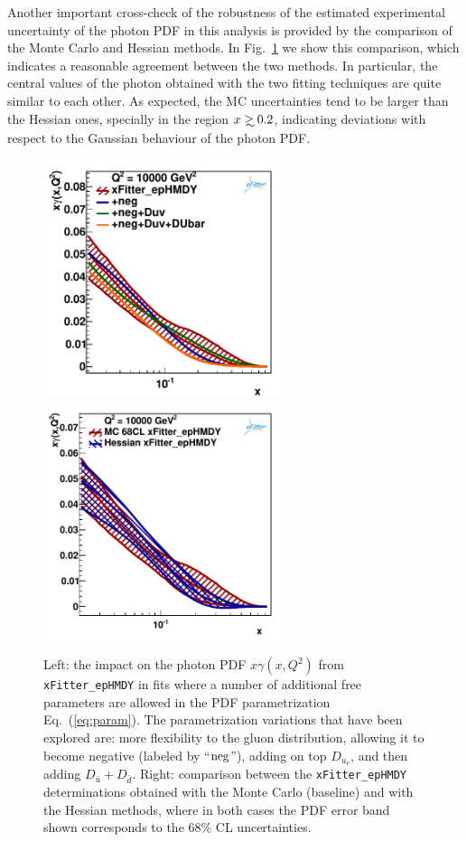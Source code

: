 Another important cross-check of the robustness of the estimated
experimental uncertainty of the photon PDF in this analysis is provided by the
comparison of the Monte Carlo and Hessian methods.
%
In Fig.~\ref{fig:photon_mc_vs_hessian} we show this comparison, which
indicates a reasonable agreement between the two methods.
%
In particular, the central values of the photon obtained with the two
fitting techniques are quite similar to each other.
%
As expected, the MC uncertainties tend to be larger than the Hessian ones,
specially in the region $x\gsim 0.2$, indicating deviations with respect
to the Gaussian behaviour of the photon PDF.

\begin{figure}[t]
\centering
\includegraphics[width=7cm]{figs/q2_10000_pdf_ph_param_var.pdf}
\includegraphics[width=7cm]{figs/photon_mc_vs_hessian} 
\caption{Left: the impact on the photon PDF $x\gamma(x,Q^2)$
  from {\tt xFitter\_epHMDY}
  in fits where a number of additional free parameters are allowed
  in the PDF parametrization Eq.~(\ref{eq:param}).
  The parametrization variations that have been explored
  are: more flexibility to the gluon distribution, allowing
  it to become negative
  (labeled by ``${\rm neg}$''), adding on top $D_{u_v}$, and then
  adding $D_{\bar{u}}+D_{\bar{d}}$.
 Right: comparison between the {\tt xFitter\_epHMDY} determinations obtained with the
 Monte Carlo (baseline) and with the Hessian methods, where in
  both cases the PDF error band  shown corresponds to the 68\% CL uncertainties.  }
\label{fig:param}
\label{fig:photon_mc_vs_hessian}
\end{figure}

